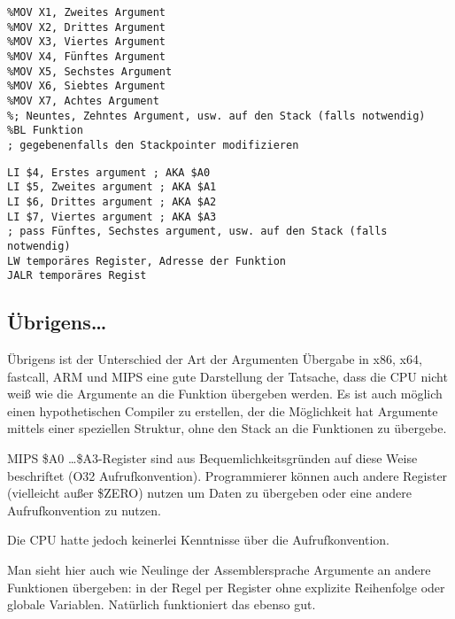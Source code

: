 \begin{lstlisting}[caption=ARM64,style=customasmARM]
%MOV X0, Erstes Argument
%MOV X1, Zweites Argument
%MOV X2, Drittes Argument
%MOV X3, Viertes Argument
%MOV X4, Fünftes Argument
%MOV X5, Sechstes Argument
%MOV X6, Siebtes Argument
%MOV X7, Achtes Argument
%; Neuntes, Zehntes Argument, usw. auf den Stack (falls notwendig)
%BL Funktion
; gegebenenfalls den Stackpointer modifizieren
\end{lstlisting}

\begin{lstlisting}[caption=MIPS (O32 calling convention),style=customasmMIPS]
LI $4, Erstes argument ; AKA $A0
LI $5, Zweites argument ; AKA $A1
LI $6, Drittes argument ; AKA $A2
LI $7, Viertes argument ; AKA $A3
; pass Fünftes, Sechstes argument, usw. auf den Stack (falls notwendig)
LW temporäres Register, Adresse der Funktion
JALR temporäres Regist
\end{lstlisting}

\subsection{Übrigens\dots{}}

Übrigens ist der Unterschied der Art der Argumenten Übergabe in x86, x64, fastcall, ARM und MIPS eine gute
Darstellung der Tatsache, dass die CPU nicht weiß wie die Argumente an die Funktion übergeben werden.
Es ist auch möglich einen hypothetischen Compiler zu erstellen, der die Möglichkeit hat Argumente mittels
einer speziellen Struktur, ohne den Stack an die Funktionen zu übergebe.

MIPS \$A0 \dots \$A3-Register sind aus Bequemlichkeitsgründen auf diese Weise beschriftet (O32 Aufrufkonvention).
Programmierer können auch andere Register (vielleicht außer \$ZERO) nutzen um Daten zu übergeben
oder eine andere Aufrufkonvention zu nutzen.

Die \ac{CPU} hatte jedoch keinerlei Kenntnisse über die Aufrufkonvention.

Man sieht hier auch wie Neulinge der Assemblersprache Argumente an andere Funktionen übergeben:
in der Regel per Register ohne explizite Reihenfolge oder globale Variablen.
Natürlich funktioniert das ebenso gut.

